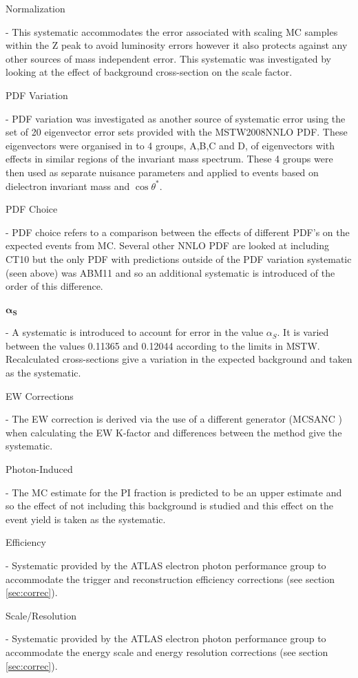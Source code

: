     {\bf\raggedright Normalization} - This systematic accommodates the error associated with scaling MC samples within the Z peak to avoid luminosity errors however it also protects against any other sources of mass independent error. This systematic was investigated by looking at the effect of background cross-section on the scale factor. \\
    {\bf\raggedright PDF Variation} - PDF variation was investigated as another source of systematic error using the set of 20 eigenvector error sets provided with the MSTW2008NNLO PDF. These eigenvectors were organised in to 4 groups, A,B,C and D, of eigenvectors with effects in similar regions of the invariant mass spectrum. These 4 groups were then used as separate nuisance parameters and applied to events based on dielectron invariant mass and $\cos{\theta^{*}}$. \\ 
    {\bf\raggedright PDF Choice} - PDF choice refers to a comparison between the effects of different PDF's on the expected events from MC. Several other NNLO PDF are looked at including CT10 but the only PDF with predictions outside of the PDF variation systematic (seen above) was ABM11 \cite{Alekhin:2013dmy} and so an additional systematic is introduced of the order of this difference. \\
    {\bf\raggedright $\boldsymbol{\alpha_{S}}$} - A systematic is introduced to account for error in the value $\alpha_{S}$. It is varied between the values 0.11365 and 0.12044 according to the limits in MSTW. Recalculated cross-sections give a variation in the expected background and taken as the systematic. \\
    {\bf\raggedright EW Corrections} - The EW correction is derived via the use of a different generator (MCSANC \cite{Bondarenko:2013nu}) when calculating the EW K-factor and differences between the method give the systematic. \\
    {\bf\raggedright Photon-Induced} - The MC estimate for the PI fraction is predicted to be an upper estimate and so the effect of not including this background is studied and this effect on the event yield is taken as the systematic. \\
    {\bf\raggedright Efficiency} - Systematic provided by the ATLAS electron photon performance group to accommodate the trigger and reconstruction efficiency corrections (see section \ref{sec:correc}). \\
    {\bf\raggedright Scale/Resolution} - Systematic provided by the ATLAS electron photon performance group to accommodate the energy scale and energy resolution corrections (see section \ref{sec:correc}). \\
